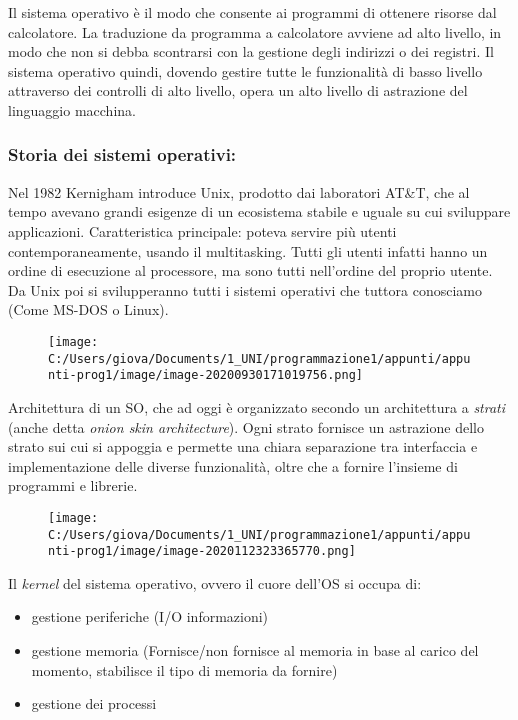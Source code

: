\documentclass[
]{article}
\begin{document}
Il sistema operativo è il modo che consente ai programmi di ottenere
risorse dal calcolatore. La traduzione da programma a calcolatore
avviene ad alto livello, in modo che non si debba scontrarsi con la
gestione degli indirizzi o dei registri. Il sistema operativo quindi,
dovendo gestire tutte le funzionalità di basso livello attraverso dei
controlli di alto livello, opera un alto livello di astrazione del
linguaggio macchina.

\hypertarget{header-n289}{%
\subsubsection{Storia dei sistemi operativi:}\label{header-n289}}

Nel 1982 Kernigham introduce Unix, prodotto dai laboratori AT\&T, che al
tempo avevano grandi esigenze di un ecosistema stabile e uguale su cui
sviluppare applicazioni. Caratteristica principale: poteva servire più
utenti contemporaneamente, usando il multitasking. Tutti gli utenti
infatti hanno un ordine di esecuzione al processore, ma sono tutti
nell'ordine del proprio utente. Da Unix poi si svilupperanno tutti i
sistemi operativi che tuttora conosciamo (Come MS-DOS o Linux).

\begin{figure}
\centering
\texttt{[image: C:/Users/giova/Documents/1\_UNI/programmazione1/appunti/appunti-prog1/image/image-20200930171019756.png]}
\caption{}
\end{figure}

Architettura di un SO, che ad oggi è organizzato secondo un architettura
a \emph{strati} (anche detta \emph{onion skin architecture}). Ogni
strato fornisce un astrazione dello strato sui cui si appoggia e
permette una chiara separazione tra interfaccia e implementazione delle
diverse funzionalità, oltre che a fornire l'insieme di programmi e
librerie.

\begin{figure}
\centering
\texttt{[image: C:/Users/giova/Documents/1\_UNI/programmazione1/appunti/appunti-prog1/image/image-2020112323365770.png]}
\caption{}
\end{figure}

Il \emph{kernel} del sistema operativo, ovvero il cuore dell'OS si
occupa di:

\begin{itemize}
\item
  gestione periferiche (I/O informazioni)
\item
  gestione memoria (Fornisce/non fornisce al memoria in base al carico
  del momento, stabilisce il tipo di memoria da fornire)
\item
  gestione dei processi
\end{itemize}
\end{document}

